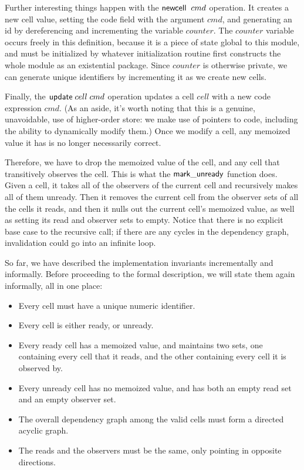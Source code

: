 Further interesting things happen with the $\mathsf{newcell}\;\;cmd$
operation.  It creates a new cell value, setting the code field with
the argument $cmd$, and generating an id by dereferencing and
incrementing the variable $counter$. The $counter$ variable occurs
freely in this definition, because it is a piece of state global to
this module, and must be initialized by whatever initialization
routine first constructs the whole module as an existential package.
Since $counter$ is otherwise private, we can generate unique
identifiers by incrementing it as we create new cells. 

Finally, the $\mathsf{update}\;cell\;cmd$ operation updates a cell
$cell$ with a new code expression $cmd$. (As an aside, it's worth
noting that this is a genuine, unavoidable, use of higher-order store:
we make use of pointers to code, including the ability to dynamically
modify them.) Once we modify a cell, any memoized value it has is no
longer necessarily correct.

Therefore, we have to drop the memoized value of the cell, and any
cell that transitively observes the cell. This is what the
$\mathsf{mark\_unready}$ function does. Given a cell, it takes all of the
observers of the current cell and recursively makes all of
them unready. Then it removes the current cell from the observer sets of
all the cells it reads, and then it nulls out the current cell's
memoized value, as well as setting its read and observer sets to
empty. Notice that there is no explicit base case to the recursive
call; if there are any cycles in the dependency graph, invalidation
could go into an infinite loop. 

So far, we have described the implementation invariants incrementally
and informally. Before proceeding to the formal description, we will
state them again informally, all in one place:

\begin{itemize}
  \item Every cell must have a unique numeric identifier.
  \item Every cell is either ready, or unready. 
  \item Every ready cell has a memoized value, and maintains 
    two sets, one containing every cell that it reads, and the
    other containing every cell it is observed by. 
  \item Every unready cell has no memoized value, and has 
    both an empty read set and an empty observer set. 
  \item The overall dependency graph among the valid cells must form a
    directed acyclic graph. 
  \item The reads and the observers must be the same, only 
    pointing in opposite directions.
\end{itemize}

